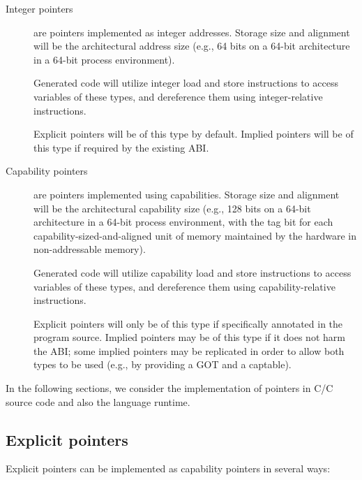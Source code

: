 \documentclass[12pt,twoside,openright,a4paper]{article}
\newcommand*{\cpp}{\texorpdfstring{C\textsmaller[2]{\protect\nolinebreak[4]\hspace{-.05em}\raisebox{.45ex}{\textbf{++}}}}{C++}}
\begin{document}
\begin{description}
\item[Integer pointers] are pointers implemented as integer addresses.
  Storage size and alignment will be the architectural address size (e.g.,
  64 bits on a 64-bit architecture in a 64-bit process environment).

  Generated code will utilize integer load and store instructions to access
  variables of these types, and dereference them using integer-relative
  instructions.

  Explicit pointers will be of this type by default.
  Implied pointers will be of this type if required by the existing ABI.

\item[Capability pointers] are pointers implemented using capabilities.
  Storage size and alignment will be the architectural capability size (e.g.,
  128 bits on a 64-bit architecture in a 64-bit process environment, with the
  tag bit for each capability-sized-and-aligned unit of memory maintained by
  the hardware in non-addressable memory).

  Generated code will utilize capability load and store instructions to access
  variables of these types, and dereference them using capability-relative
  instructions.

  Explicit pointers will only be of this type if specifically annotated in the
  program source.
  Implied pointers may be of this type if it does not harm the ABI; some
  implied pointers may be replicated in order to allow both types to be used
  (e.g., by providing a GOT and a captable).
\end{description}

In the following sections, we consider the implementation of pointers in
C/\cpp{} source code and also the language runtime.

\subsection{Explicit pointers}

Explicit pointers can be implemented as capability pointers in several ways:
\end{document}
